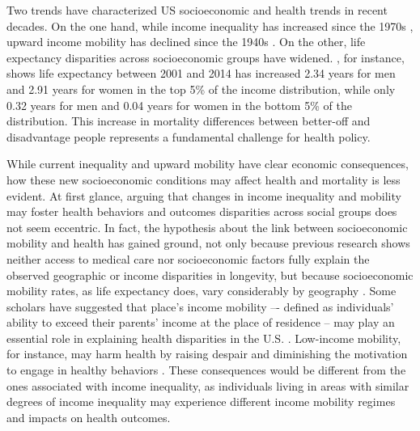 \documentclass[class=article, crop=false, 12pt]{standalone}
\begin{document}
\onlyifstandalone{
    \begin{refsection}
    \doublespacing
    \setlength\parskip{0pt}
}


Two trends have characterized US socioeconomic and health trends in recent decades. On the one hand, while income inequality has increased since the 1970s \citep{gould2019}, upward income mobility has declined since the 1940s \citep{chetty2017}. On the other, life expectancy disparities across socioeconomic groups have widened. 
\citet{chetty2016}, for instance, shows life expectancy between 2001 and 2014 has increased 2.34 years for men and 2.91 years for women in the top 5\% of the income distribution, while only 0.32 years for men and 0.04 years for women in the bottom 5\% of the distribution. This increase in mortality differences between better-off and disadvantage people represents a fundamental challenge for health policy.


While current inequality and upward mobility have clear economic consequences, how these new socioeconomic conditions may affect health and mortality is less evident. At first glance, arguing that changes in income inequality and mobility may foster health behaviors and outcomes disparities across social groups does not seem eccentric. In fact, the hypothesis about the link between socioeconomic mobility and health has gained ground, not only because previous research shows neither access to medical care nor socioeconomic factors fully explain the observed geographic or income disparities in longevity, but because socioeconomic mobility rates, as life expectancy does, vary considerably by geography \citep{chetty2014}. 
Some scholars have suggested that place's income mobility –- defined as individuals' ability to exceed their parents' income at the place of residence -- may play an essential role in explaining health disparities in the U.S. \citep{venkataramani2020, venkataramani2020a, venkataramani2016, venkataramani2015, daza2018a}. Low-income mobility, for instance, may harm health by raising despair and diminishing the motivation to engage in healthy behaviors \citep{case2020, schilbach2016}. These consequences would be different from the ones associated with income inequality, as individuals living in areas with similar degrees of income inequality may experience different income mobility regimes and impacts on health outcomes.
\end{document}
